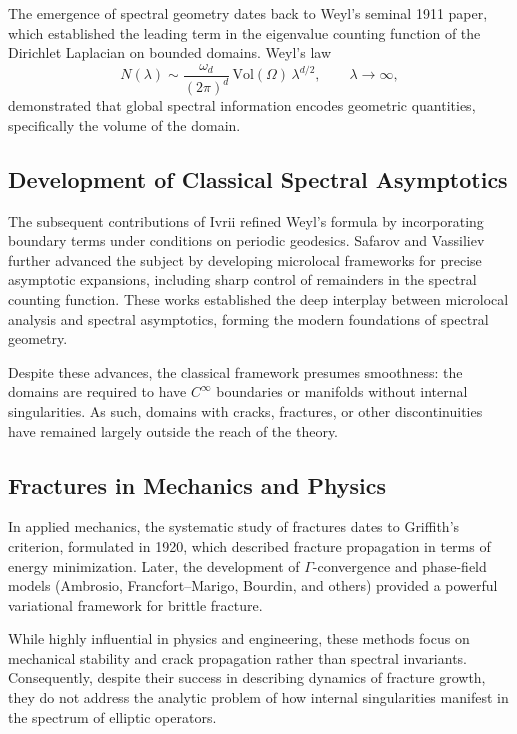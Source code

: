 The emergence of spectral geometry dates back to Weyl’s seminal 1911 paper, 
which established the leading term in the eigenvalue counting function of the 
Dirichlet Laplacian on bounded domains. Weyl’s law
\[
  N(\lambda) \sim \frac{\omega_d}{(2\pi)^d}\,\mathrm{Vol}(\Omega)\,\lambda^{d/2}, 
  \qquad \lambda\to\infty,
\]
demonstrated that global spectral information encodes geometric quantities, 
specifically the volume of the domain.

\subsection{Development of Classical Spectral Asymptotics}

The subsequent contributions of Ivrii refined Weyl’s formula by incorporating 
boundary terms under conditions on periodic geodesics. Safarov and Vassiliev 
further advanced the subject by developing microlocal frameworks for precise 
asymptotic expansions, including sharp control of remainders in the spectral 
counting function. These works established the deep interplay between 
microlocal analysis and spectral asymptotics, forming the modern foundations 
of spectral geometry.

Despite these advances, the classical framework presumes smoothness: the 
domains are required to have $C^\infty$ boundaries or manifolds without 
internal singularities. As such, domains with cracks, fractures, or other 
discontinuities have remained largely outside the reach of the theory.

\subsection{Fractures in Mechanics and Physics}

In applied mechanics, the systematic study of fractures dates to Griffith’s 
criterion, formulated in 1920, which described fracture propagation in terms 
of energy minimization. Later, the development of $\Gamma$-convergence and 
phase-field models (Ambrosio, Francfort–Marigo, Bourdin, and others) provided 
a powerful variational framework for brittle fracture.

While highly influential in physics and engineering, these methods focus on 
mechanical stability and crack propagation rather than spectral invariants. 
Consequently, despite their success in describing dynamics of fracture growth, 
they do not address the analytic problem of how internal singularities 
manifest in the spectrum of elliptic operators.

